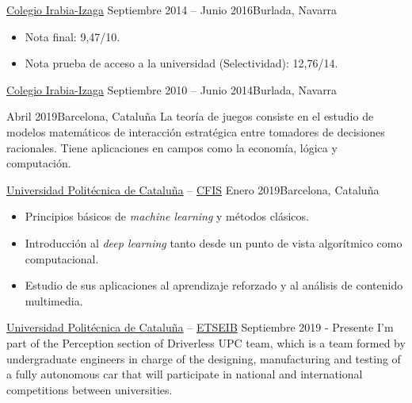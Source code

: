 \documentclass[10pt, a4paper, ragged2e]{altacv}
\begin{document}
\divider

{\href{https://www.irabia-izaga.org}{Colegio Irabia-Izaga}}
{Septiembre 2014 -- Junio 2016}{Burlada, Navarra}
\begin{itemize}
  \item Nota final: 9,47/10.
  \item Nota prueba de acceso a la universidad (Selectividad): 12,76/14.
\end{itemize}

\divider

{\href{https://www.irabia-izaga.org}{Colegio Irabia-Izaga}}
{Septiembre 2010 -- Junio 2014}{Burlada, Navarra}

\medskip
{}

{Abril 2019}{Barcelona, Cataluña}
La teoría de juegos consiste en el estudio de modelos matemáticos de interacción
estratégica entre tomadores de decisiones racionales. Tiene aplicaciones en
campos como la economía, lógica y computación.

\vspace{.1cm}
\divider
\vspace{.15cm}

{\href{https://upc.edu}{Universidad Politécnica de Cataluña} --
  \href{https://cfis.upc.edu}{CFIS}}
{Enero 2019}{Barcelona, Cataluña}
\begin{itemize}
  \item Principios básicos de \textit{machine learning} y métodos clásicos.
  \item Introducción al \textit{deep learning} tanto desde un punto de vista
  algorítmico como computacional.
  \item Estudio de sus aplicaciones al aprendizaje reforzado y al análisis de
  contenido multimedia.
\end{itemize}


\clearpage


{\href{https://upc.edu}{Universidad Politécnica de Cataluña} --
\href{https://etseib.upc.edu}{ETSEIB}}
{Septiembre 2019 - Presente}{}
I'm part of the Perception section of Driverless UPC team, which is a team
formed by undergraduate engineers in charge of the designing, manufacturing and
testing of a fully autonomous car that will participate in national and
international competitions between universities.
\end{document}
